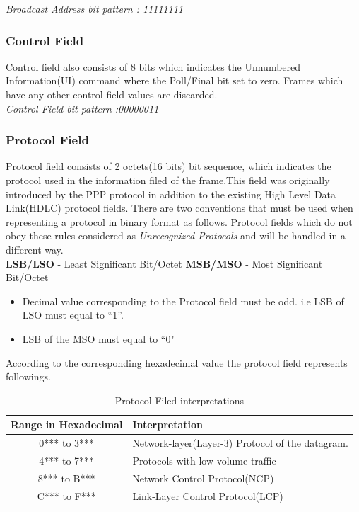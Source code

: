 \documentclass[a4paper,11pt]{article}%
\begin{document}
\textit{Broadcast Address  bit pattern : 11111111} 
\subsubsection{Control Field}

Control field also consists of 8 bits which indicates the Unnumbered Information(UI) command where the Poll/Final bit set to zero. Frames which have any other control field values are discarded.\\

\textit{Control Field bit pattern :00000011}

\subsubsection{Protocol Field}

Protocol field consists of 2 octets(16 bits) bit sequence, which indicates the protocol used in the information filed of the frame.This field was originally introduced by the PPP protocol in addition to the existing High Level Data Link(HDLC) protocol fields. There are two conventions that must be used when representing a protocol in binary format as follows. Protocol fields which do not obey these rules considered as \textit{ Unrecognized Protocols} and will be handled in a different way.\\

\textbf{LSB/LSO} - Least Significant Bit/Octet \hfill \textbf{MSB/MSO} - Most Significant Bit/Octet


\begin{itemize}
	\item Decimal value corresponding to the Protocol field must be odd. i.e LSB of LSO must equal to ``1''.
	\item LSB of the MSO must equal to ``0"
\end{itemize}

According to the corresponding hexadecimal value the protocol field represents followings.

\begin{table}[!h]
	\centering
	\begin{tabular}[!h]{c |l}
	Range in Hexadecimal& Interpretation\\\hline
	0*** to 3***	& Network-layer(Layer-3) Protocol of the datagram.\\
	4*** to 7*** & Protocols with low volume traffic\\
	8*** to B*** & Network Control Protocol(NCP)\\
	C*** to F***& Link-Layer Control Protocol(LCP)\\\hline\hline
\end{tabular}
\caption{Protocol Filed interpretations\cite{ppp}}
\end{table}
\end{document}

